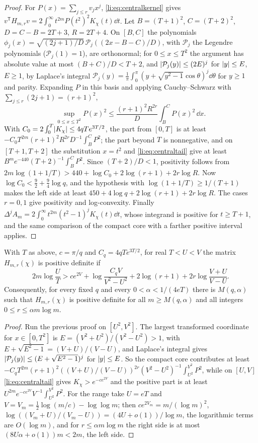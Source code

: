\begin{proof}
For $P(x)=\sum_{j\le r}v_jx^j$, \eqref{li:eq:centralkernel} gives $v^{\mathsf T}H_{m,r}v=2\int_0^\infty t^{2m}P(t^2)^2K_\chi(t)\dd t$.
Let $B=(T+1)^2$, $C=(T+2)^2$, $D=C-B=2T+3$, $R=2T+4$. On $[B,C]$ the polynomials
$\phi_j(x)=\sqrt{(2j+1)/D}\,\mathcal P_j((2x-B-C)/D)$, with $\mathcal P_j$ the Legendre polynomials
($\mathcal P_j(1)=1$), are orthonormal; for $0\le x\le T^2$ the argument has absolute value at most
$(B+C)/D<T+2$, and $\lvert\mathcal P_j(y)\rvert\le(2E)^j$ for $\lvert y\rvert\le E$, $E\ge1$, by Laplace's integral
$\mathcal P_j(y)=\frac1\pi\int_0^\pi(y+\sqrt{y^2-1}\cos\theta)^j\dd\theta$ for $y\ge1$ and parity. Expanding $P$ in
this basis and applying Cauchy--Schwarz with $\sum_{j\le r}(2j+1)=(r+1)^2$,
\[
 \sup_{0\le x\le T^2}P(x)^2\le\frac{(r+1)^2R^{2r}}D\int_B^CP(x)^2\,\dd x.
\]
With $C_0=2\int_0^T\lvert K_\chi\rvert\le4qTe^{3T/2}$, the part from $[0,T]$ is at least
$-C_0T^{2m}(r+1)^2R^{2r}D^{-1}\int_B^CP^2$; the part beyond $T$ is nonnegative, and on $[T+1,T+2]$ the
substitution $x=t^2$ and \eqref{li:eq:centraltail} give at least $B^me^{-440}(T+2)^{-1}\int_B^CP^2$. Since
$(T+2)/D<1$, positivity follows from $2m\log(1+1/T)>440+\log C_0+2\log(r+1)+2r\log R$. Now
$\log C_0<\frac92+\frac94\log q$, and the hypothesis with $\log(1+1/T)\ge1/(T+1)$ makes the left side at least
$450+4\log q+2\log(r+1)+2r\log R$. The cases $r=0,1$ give positivity and log-convexity. Finally
$\Delta^jA_m=2\int_0^\infty t^{2m}(t^2-1)^jK_\chi(t)\dd t$, whose integrand is positive for $t\ge T+1$, and the same
comparison of the compact core with a farther positive interval applies.
\end{proof}

\begin{theorem}\label{li:thm:centralsuper}
With $T$ as above, $c=\pi/q$ and $C_q=4qTe^{3T/2}$, for real $T<U<V$ the matrix $H_{m,r}(\chi)$ is positive
definite if
\[
 2m\log\frac UT>ce^{2V}+\log\frac{C_qV}{V^2-U^2}+2\log(r+1)+2r\log\frac{V+U}{V-U}.
\]
Consequently, for every fixed $q$ and every $0<\alpha<1/(4eT)$ there is $M(q,\alpha)$ such that $H_{m,r}(\chi)$ is
positive definite for all $m\ge M(q,\alpha)$ and all integers $0\le r\le\alpha m\log m$.
\end{theorem}

\begin{proof}
Run the previous proof on $[U^2,V^2]$. The largest transformed coordinate for $x\in[0,T^2]$ is
$E=(V^2+U^2)/(V^2-U^2)>1$, with $E+\sqrt{E^2-1}=(V+U)/(V-U)$, and Laplace's integral gives
$\lvert\mathcal P_j(y)\rvert\le(E+\sqrt{E^2-1})^j$ for $\lvert y\rvert\le E$. So the compact core contributes at least
$-C_qT^{2m}(r+1)^2((V+U)/(V-U))^{2r}(V^2-U^2)^{-1}\int_{U^2}^{V^2}P^2$, while on $[U,V]$
\eqref{li:eq:centraltail} gives $K_\chi>e^{-ce^{2V}}$ and the positive part is at least
$U^{2m}e^{-ce^{2V}}V^{-1}\int_{U^2}^{V^2}P^2$. For the range take $U=eT$ and
$V=V_m=\frac12\log(m/c)-\log\log m$; then $ce^{2V_m}=m/(\log m)^2$, $\log((V_m+U)/(V_m-U))=(4U+o(1))/\log m$,
the logarithmic terms are $O(\log m)$, and for $r\le\alpha m\log m$ the right side is at most
$(8U\alpha+o(1))m<2m$, the left side.
\end{proof}

